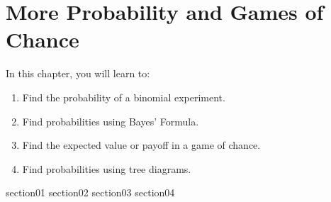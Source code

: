 \chapter{More Probability and Games of Chance}\label{chapter_more_probability}

In this chapter, you will learn to:
\begin{enumerate}
    \item Find the probability of a binomial experiment.
    \item Find probabilities using Bayes' Formula.
    \item Find the expected value or payoff in a game of chance.
    \item Find probabilities using tree diagrams.
\end{enumerate}

{section01}
{section02}
{section03}
{section04}